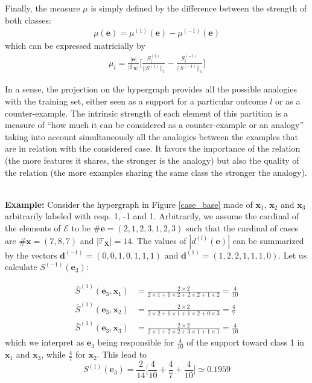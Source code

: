 \documentclass[preprint,12pt]{elsarticle}
\theoremstyle{definition}
\begin{document}
Finally, the measure $\mu$ is simply defined by the difference between the strength of both classes:
\begin{align}
  \mu(\mathbf e) = \mu^{(1)}(\mathbf e) - \mu^{(-1)}(\mathbf e)
\end{align} which can be expressed matricially by
\begin{align}
  \mu_i = \frac{|\mathbf e|}{|\mathbb{F}_{\mathbf X}|}\big[ \frac{S^{(1)}_{i}}{||S^{(1)}||_1} - \frac{S^{(-1)}_{i}}{||S^{(-1)}||_1} \big]
\end{align}

In a sense, the projection on the hypergraph provides all the possible analogies with the training set, either seen as a support for a particular outcome $l$ or as a counter-example. The intrinsic strength of each element of this partition is a measure of ``how much it can be considered as a counter-example or an analogy'' taking into account simultaneously all the analogies between the examples that are in relation with the considered case. It favors the importance of the relation (the more features it shares, the stronger is the analogy) but also the quality of the relation (the more examples sharing the same class the stronger the analogy). 


~\\\noindent
{\bf Example:} Consider the hypergraph in Figure \ref{case_base} made of $\mathbf x_1$, $\mathbf x_2$ and $\mathbf x_3$ arbitrarily labeled with resp. 1, -1 and 1. Arbitrarily, we assume the cardinal of the elements of $\mathcal E$ to be $\mathbf{\#e} = (2,1,2,3,1,2,3)$ such that the cardinal of cases are $\#\mathbf x = (7, 8, 7)$ and $|\mathbb{F}_{\mathbf X}| = 14$. The values of $|d^{(l)}(\mathbf e)|$ can be summarized by the vectors $\mathbf d^{(-1)} = (0, 0, 1, 0, 1, 1, 1)$ and $\mathbf d^{(1)} = (1 , 2, 2, 1, 1, 1, 0)$. Let us calculate $S^{(-1)}(\mathbf e_3)$:

\begin{align*}
\bar S^{(1)}(\mathbf e_3, \mathbf x_1) & = \frac{2 \times 2}{2 \times 1 + 1 \times 2 + 2 \times 2 + 1 \times 2} = \frac 4 {10} \\
\bar S^{(1)}(\mathbf e_3, \mathbf x_2) & = \frac{2 \times 2}{2 \times 2 + 1 \times 1 + 1 \times 2 + 0 \times 3} = \frac 4 {7} \\
\bar S^{(1)}(\mathbf e_3, \mathbf x_3) & = \frac{2 \times 2}{2 \times 1 + 2 \times 2 + 3 \times 1 + 1 \times 1} = \frac 4 {10}
\end{align*}
 which we interpret as $\mathbf e_3$ being responsible for $\frac{4}{10}$ of the support toward class 1 in $\mathbf x_1$ and $\mathbf x_3$, while $\frac{4}{7}$ for $\mathbf x_2$.
This lead to
$$S^{(1)}(\mathbf e_3) = \frac 2 {14} \big[ \frac 4 {10} + \frac 4 {7} + \frac 4 {10}\big] \simeq 0.1959$$
\end{document}
